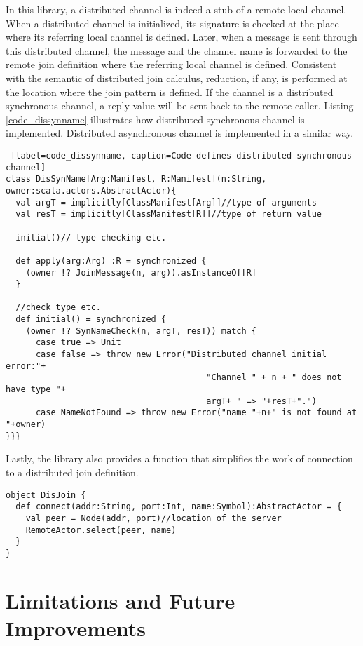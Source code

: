 In this library, a distributed channel is indeed a stub of a remote local channel.  When a distributed channel is initialized, its signature is checked at the place where its referring local channel is defined.  Later, when a message is sent through this distributed channel, the message and the channel name is forwarded to the remote join definition where the  referring local channel is defined.  Consistent with the semantic of distributed join calculus, reduction, if any, is performed at the location where the join pattern is defined.  If the channel is a distributed synchronous channel, a reply value will be sent back to the remote caller.  Listing \ref{code_dissynname} illustrates how distributed synchronous channel is implemented.  Distributed asynchronous channel is implemented in a similar way.  


\begin{lstlisting} [label=code_dissynname, caption=Code defines distributed synchronous channel]
class DisSynName[Arg:Manifest, R:Manifest](n:String, owner:scala.actors.AbstractActor){
  val argT = implicitly[ClassManifest[Arg]]//type of arguments
  val resT = implicitly[ClassManifest[R]]//type of return value
  
  initial()// type checking etc.
  
  def apply(arg:Arg) :R = synchronized {
    (owner !? JoinMessage(n, arg)).asInstanceOf[R]
  }
  
  //check type etc.
  def initial() = synchronized {
    (owner !? SynNameCheck(n, argT, resT)) match {
      case true => Unit
      case false => throw new Error("Distributed channel initial error:"+
                                        "Channel " + n + " does not have type "+
                                        argT+ " => "+resT+".")
      case NameNotFound => throw new Error("name "+n+" is not found at "+owner)
}}}
\end{lstlisting}

Lastly, the library also provides a function that simplifies the work of connection to a distributed join definition.

\begin{lstlisting}
object DisJoin {
  def connect(addr:String, port:Int, name:Symbol):AbstractActor = {
    val peer = Node(addr, port)//location of the server
    RemoteActor.select(peer, name)
  }
}
\end{lstlisting}




\section{Limitations and Future Improvements}
